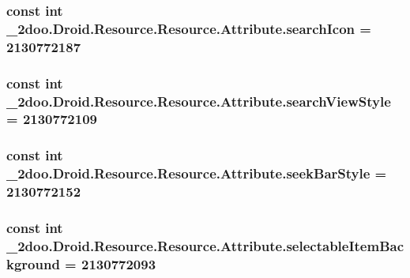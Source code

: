 \hypertarget{class__2doo_1_1_droid_1_1_resource_1_1_attribute_c61d33f574c639770f092a652c85c803}{
\subsubsection[{searchIcon}]{\setlength{\rightskip}{0pt plus 5cm}const int \_\-2doo.Droid.Resource.Resource.Attribute.searchIcon = 2130772187}}
\label{class__2doo_1_1_droid_1_1_resource_1_1_attribute_c61d33f574c639770f092a652c85c803}


\hypertarget{class__2doo_1_1_droid_1_1_resource_1_1_attribute_9a5b41fa756e5cd61aba0c0c545432d7}{
\subsubsection[{searchViewStyle}]{\setlength{\rightskip}{0pt plus 5cm}const int \_\-2doo.Droid.Resource.Resource.Attribute.searchViewStyle = 2130772109}}
\label{class__2doo_1_1_droid_1_1_resource_1_1_attribute_9a5b41fa756e5cd61aba0c0c545432d7}


\hypertarget{class__2doo_1_1_droid_1_1_resource_1_1_attribute_f8e82291c56a60c8bc33a0dd4ae609f5}{
\subsubsection[{seekBarStyle}]{\setlength{\rightskip}{0pt plus 5cm}const int \_\-2doo.Droid.Resource.Resource.Attribute.seekBarStyle = 2130772152}}
\label{class__2doo_1_1_droid_1_1_resource_1_1_attribute_f8e82291c56a60c8bc33a0dd4ae609f5}


\hypertarget{class__2doo_1_1_droid_1_1_resource_1_1_attribute_d3c8bd4352b7dfa314b1342730484496}{
\subsubsection[{selectableItemBackground}]{\setlength{\rightskip}{0pt plus 5cm}const int \_\-2doo.Droid.Resource.Resource.Attribute.selectableItemBackground = 2130772093}}
\label{class__2doo_1_1_droid_1_1_resource_1_1_attribute_d3c8bd4352b7dfa314b1342730484496}


